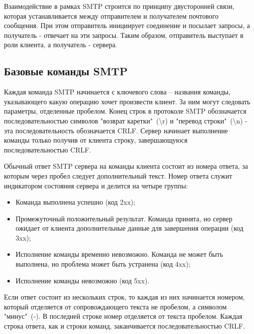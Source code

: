 \documentclass[a4paper,12pt]{report}
\begin{document}
Взаимодействие в рамках SMTP строится по принципу двусторонней связи, которая устанавливается между отправителем и получателем почтового сообщения. При этом отправитель инициирует соединение и посылает запросы, а получатель - отвечает на эти запросы. Таким образом, отправитель выступает в роли клиента, а получатель - сервера.


\subsection{Базовые команды SMTP}

Каждая команда SMTP начинается с ключевого слова – названия команды, указывающего какую операцию хочет произвести клиент. За ним могут следовать параметры, отделенные пробелом. Конец строк в протоколе SMTP обозначается последовательностью символов "возврат каретки"\ (\textbackslash r) и "перевод строки"\ (\textbackslash n) - эта последовательность обозначается CRLF. Сервер начинает выполнение команды только получив от клиента строку, завершающуюся последовательностью CRLF. 

Обычный ответ SMTP сервера на команды клиента состоит из номера ответа, за которым через пробел следует дополнительный текст. Номер ответа служит индикатором состояния сервера и делится на четыре группы:
\begin{itemize}
    \item Команда выполнена успешно (код 2xx);
    \item Промежуточный положительный результат. Команда принята, но сервер ожидает от клиента дополнительные данные для завершения операции (код 3xx);
    \item Исполнение команды временно невозможно. Команда не может быть выполнена, но проблема может быть устранена (код 4xx);
    \item Исполнение команды невозможно (код 5xx).
\end{itemize}

Если ответ состоит из нескольких строк, то каждая из них начинается номером, который отделяется от сопровождающего текста не пробелом, а символом "минус"\ (-). В последней строке номер отделяется от текста пробелом. Каждая строка ответа, как и строки команд, заканчивается последовательностью CRLF.
\end{document}
